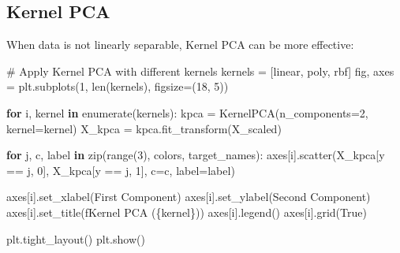 \documentclass[
  letterpaper,
  DIV=11,
  numbers=noendperiod]{scrreprt}
\newenvironment{Shaded}{\begin{snugshade}}{\end{snugshade}}
\newcommand{\BuiltInTok}[1]{\textcolor[rgb]{0.00,0.23,0.31}{#1}}
\newcommand{\CommentTok}[1]{\textcolor[rgb]{0.37,0.37,0.37}{#1}}
\newcommand{\ControlFlowTok}[1]{\textcolor[rgb]{0.00,0.23,0.31}{\textbf{#1}}}
\newcommand{\DecValTok}[1]{\textcolor[rgb]{0.68,0.00,0.00}{#1}}
\newcommand{\KeywordTok}[1]{\textcolor[rgb]{0.00,0.23,0.31}{\textbf{#1}}}
\newcommand{\NormalTok}[1]{\textcolor[rgb]{0.00,0.23,0.31}{#1}}
\newcommand{\OperatorTok}[1]{\textcolor[rgb]{0.37,0.37,0.37}{#1}}
\newcommand{\SpecialCharTok}[1]{\textcolor[rgb]{0.37,0.37,0.37}{#1}}
\newcommand{\SpecialStringTok}[1]{\textcolor[rgb]{0.13,0.47,0.30}{#1}}
\newcommand{\StringTok}[1]{\textcolor[rgb]{0.13,0.47,0.30}{#1}}
\newcommand{\VariableTok}[1]{\textcolor[rgb]{0.07,0.07,0.07}{#1}}
\begin{document}
\subsection{Kernel PCA}\label{kernel-pca}

When data is not linearly separable, Kernel PCA can be more effective:

\begin{Shaded}
\begin{Highlighting}[]
\CommentTok{\# Apply Kernel PCA with different kernels}
\NormalTok{kernels }\OperatorTok{=}\NormalTok{ [}\StringTok{\textquotesingle{}linear\textquotesingle{}}\NormalTok{, }\StringTok{\textquotesingle{}poly\textquotesingle{}}\NormalTok{, }\StringTok{\textquotesingle{}rbf\textquotesingle{}}\NormalTok{]}
\NormalTok{fig, axes }\OperatorTok{=}\NormalTok{ plt.subplots(}\DecValTok{1}\NormalTok{, }\BuiltInTok{len}\NormalTok{(kernels), figsize}\OperatorTok{=}\NormalTok{(}\DecValTok{18}\NormalTok{, }\DecValTok{5}\NormalTok{))}

\ControlFlowTok{for}\NormalTok{ i, kernel }\KeywordTok{in} \BuiltInTok{enumerate}\NormalTok{(kernels):}
\NormalTok{    kpca }\OperatorTok{=}\NormalTok{ KernelPCA(n\_components}\OperatorTok{=}\DecValTok{2}\NormalTok{, kernel}\OperatorTok{=}\NormalTok{kernel)}
\NormalTok{    X\_kpca }\OperatorTok{=}\NormalTok{ kpca.fit\_transform(X\_scaled)}
    
    \ControlFlowTok{for}\NormalTok{ j, c, label }\KeywordTok{in} \BuiltInTok{zip}\NormalTok{(}\BuiltInTok{range}\NormalTok{(}\DecValTok{3}\NormalTok{), colors, target\_names):}
\NormalTok{        axes[i].scatter(X\_kpca[y }\OperatorTok{==}\NormalTok{ j, }\DecValTok{0}\NormalTok{], X\_kpca[y }\OperatorTok{==}\NormalTok{ j, }\DecValTok{1}\NormalTok{], c}\OperatorTok{=}\NormalTok{c, label}\OperatorTok{=}\NormalTok{label)}
    
\NormalTok{    axes[i].set\_xlabel(}\StringTok{\textquotesingle{}First Component\textquotesingle{}}\NormalTok{)}
\NormalTok{    axes[i].set\_ylabel(}\StringTok{\textquotesingle{}Second Component\textquotesingle{}}\NormalTok{)}
\NormalTok{    axes[i].set\_title(}\SpecialStringTok{f\textquotesingle{}Kernel PCA (}\SpecialCharTok{\{}\NormalTok{kernel}\SpecialCharTok{\}}\SpecialStringTok{)\textquotesingle{}}\NormalTok{)}
\NormalTok{    axes[i].legend()}
\NormalTok{    axes[i].grid(}\VariableTok{True}\NormalTok{)}

\NormalTok{plt.tight\_layout()}
\NormalTok{plt.show()}
\end{Highlighting}
\end{Shaded}
\end{document}
